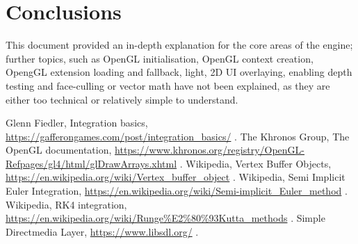 \documentclass{scrartcl}
\begin{document}
\section{Conclusions}
This document provided an in-depth explanation for the core areas of the engine; further topics, such as OpenGL initialisation, OpenGL context creation, OpengGL extension loading and fallback, light, 2D UI overlaying, enabling depth testing and face-culling or vector math have not been explained, as they are either too technical or relatively simple to understand.

\begin{thebibliography}{9}
  Glenn Fiedler,
  Integration basics,
  \url{https://gafferongames.com/post/integration_basics/}
  .
  The Khronos Group,
  The OpenGL documentation,
  \url{https://www.khronos.org/registry/OpenGL-Refpages/gl4/html/glDrawArrays.xhtml}
  .
  Wikipedia,
  Vertex Buffer Objects,
  \url{https://en.wikipedia.org/wiki/Vertex_buffer_object}
  .
  Wikipedia,
  Semi Implicit Euler Integration,
  \url{https://en.wikipedia.org/wiki/Semi-implicit_Euler_method}
  .
  Wikipedia,
  RK4 integration,
  \url{https://en.wikipedia.org/wiki/Runge%E2%80%93Kutta_methods}
    .
  Simple Directmedia Layer,
  \url{https://www.libsdl.org/}
  .
\end{thebibliography}
\end{document}
